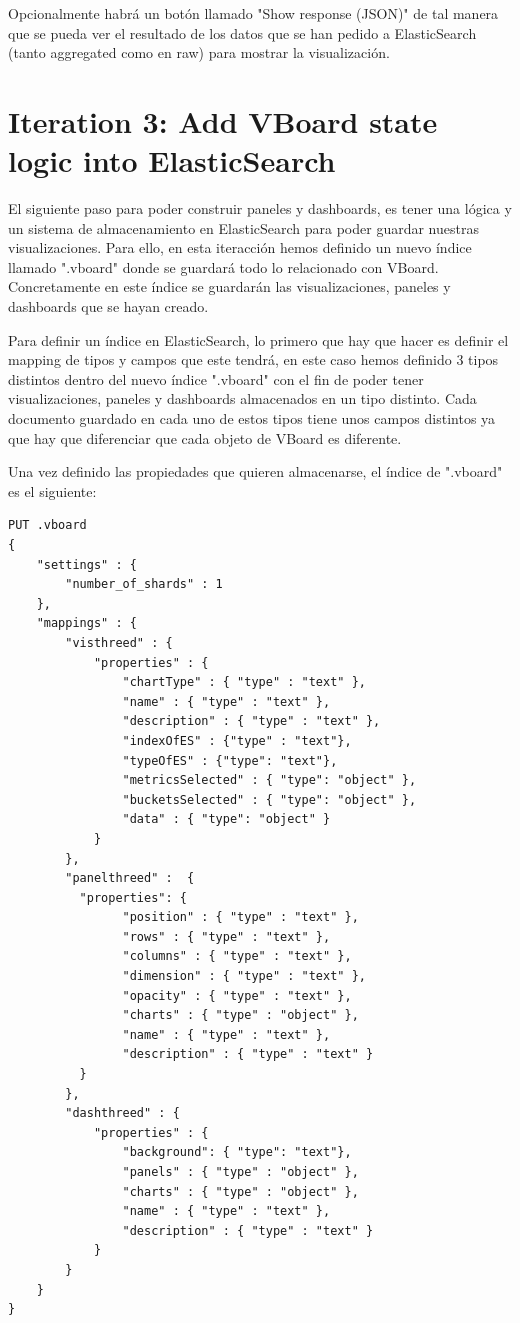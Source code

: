 \documentclass[a4paper, 12pt]{book}
\begin{document}
Opcionalmente habrá un botón llamado "Show response (JSON)" de tal manera que se pueda ver el resultado de los datos que se han pedido a ElasticSearch (tanto aggregated como en raw) para mostrar la visualización.


\section{Iteration 3: Add VBoard state logic into ElasticSearch}

El siguiente paso para poder construir paneles y dashboards, es tener una lógica y un sistema de almacenamiento en ElasticSearch para poder guardar nuestras visualizaciones. Para ello, en esta iteracción hemos definido un nuevo índice llamado ".vboard" donde se guardará todo lo relacionado con VBoard. Concretamente en este índice se guardarán las visualizaciones, paneles y dashboards que se hayan creado.

Para definir un índice en ElasticSearch, lo primero que hay que hacer es definir el mapping de tipos y campos que este tendrá, en este caso hemos definido 3 tipos distintos dentro del nuevo índice ".vboard" con el fin de poder tener visualizaciones, paneles y dashboards almacenados en un tipo distinto. Cada documento guardado en cada uno de estos tipos tiene unos campos distintos ya que hay que diferenciar que cada objeto de VBoard es diferente.

Una vez definido las propiedades que quieren almacenarse, el índice de ".vboard" es el siguiente:

\begin{lstlisting}[frame=single]
PUT .vboard
{
    "settings" : {
        "number_of_shards" : 1
    },
    "mappings" : {
        "visthreed" : {
            "properties" : {
                "chartType" : { "type" : "text" },
                "name" : { "type" : "text" },
                "description" : { "type" : "text" },
                "indexOfES" : {"type" : "text"},
                "typeOfES" : {"type": "text"},
                "metricsSelected" : { "type": "object" },
                "bucketsSelected" : { "type": "object" },
                "data" : { "type": "object" }
            }
        },
        "panelthreed" :  {
          "properties": {
                "position" : { "type" : "text" },
                "rows" : { "type" : "text" },
                "columns" : { "type" : "text" },
                "dimension" : { "type" : "text" },
                "opacity" : { "type" : "text" },
                "charts" : { "type" : "object" },
                "name" : { "type" : "text" },
                "description" : { "type" : "text" }
          }
        },
        "dashthreed" : {
            "properties" : {
                "background": { "type": "text"},
                "panels" : { "type" : "object" },
                "charts" : { "type" : "object" },
                "name" : { "type" : "text" },
                "description" : { "type" : "text" }
            }
        }
    }
}
\end{lstlisting}
\end{document}
